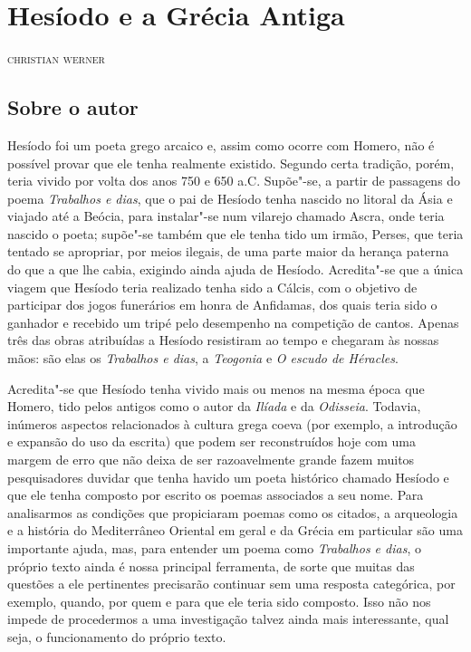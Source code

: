 \chapter{Hesíodo e a Grécia Antiga}

\begin{flushright}
\textsc{christian werner}
\end{flushright}\bigskip

\section{Sobre o autor}

\noindent{}Hesíodo foi um poeta grego arcaico e, assim como ocorre com Homero,
não é possível provar que ele tenha realmente existido. Segundo certa tradição,
porém, teria vivido por volta dos anos 750 e 650 a.C.  Supõe"-se, a partir de
passagens do poema \textit{Trabalhos e dias}, que o pai de Hesíodo tenha
nascido no litoral da Ásia e viajado até a Beócia, para instalar"-se num
vilarejo chamado Ascra, onde teria nascido o poeta; supõe"-se também que ele
tenha tido um irmão, Perses, que teria tentado se apropriar, por meios ilegais,
de uma parte maior da herança paterna do que a que lhe cabia, exigindo ainda
ajuda de Hesíodo. Acredita"-se que a única viagem que Hesíodo teria realizado
tenha sido a Cálcis, com o objetivo de participar dos jogos funerários em honra
de Anfidamas, dos quais teria sido o ganhador e recebido um tripé pelo
desempenho na competição de cantos. Apenas três das obras atribuídas a Hesíodo
resistiram ao tempo e chegaram às nossas mãos: são elas os \textit{Trabalhos e
dias}, a \textit{Teogonia} e \textit{O escudo de Héracles}.

Acredita"-se que Hesíodo tenha vivido mais ou menos na mesma época que Homero,
tido pelos antigos como o autor da \emph{Ilíada} e da
\emph{Odisseia}. Todavia, inúmeros aspectos relacionados à cultura grega
coeva (por exemplo, a introdução e expansão do uso da escrita) que podem
ser reconstruídos hoje com uma margem de erro que não deixa de ser
razoavelmente grande fazem muitos pesquisadores duvidar que tenha havido
um poeta histórico chamado Hesíodo e que ele tenha composto por escrito
os poemas associados a seu nome. Para analisarmos as condições que
propiciaram poemas como os citados, a arqueologia e a história do
Mediterrâneo Oriental em geral e da Grécia em particular são uma
importante ajuda, mas, para entender um poema como \emph{Trabalhos e
dias}, o próprio texto ainda é nossa principal ferramenta, de sorte que
muitas das questões a ele pertinentes precisarão continuar sem uma
resposta categórica, por exemplo, quando, por quem e para que ele teria
sido composto. Isso não nos impede de procedermos a uma investigação
talvez ainda mais interessante, qual seja, o funcionamento do próprio
texto.


